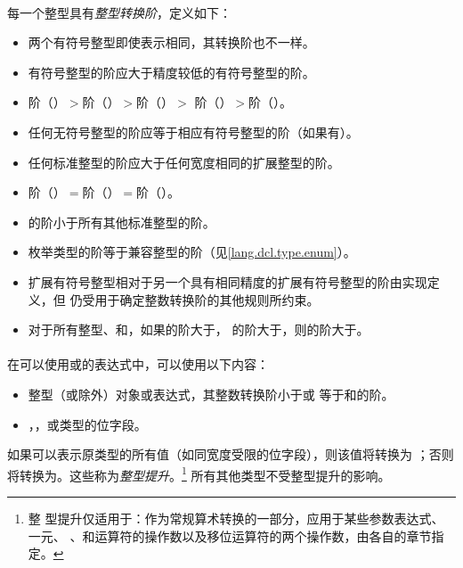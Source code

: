 {\paragraph{}
每一个整型具有\textit{整型转换阶}，定义如下：
\begin{itemize}
  \item{两个有符号整型即使表示相同，其转换阶也不一样。}
  \item{有符号整型的阶应大于精度较低的有符号整型的阶。}
  \item{阶（）$>$阶（）$>$阶（）$>$
    阶（）$>$阶（）。}
  \item{任何无符号整型的阶应等于相应有符号整型的阶（如果有）。}
  \item{任何标准整型的阶应大于任何宽度相同的扩展整型的阶。}
  \item{阶（）$=$阶（）$=$阶（）。}
  \item{的阶小于所有其他标准整型的阶。}
  \item{枚举类型的阶等于兼容整型的阶（见\ref{lang.dcl.type.enum}）。}
  \item{扩展有符号整型相对于另一个具有相同精度的扩展有符号整型的阶由实现定义，但
    仍受用于确定整数转换阶的其他规则所约束。}
  \item{对于所有整型、和，如果的阶大于，
    的阶大于，则的阶大于。}
\end{itemize}

\paragraph{}
在可以使用或的表达式中，可以使用以下内容：
\begin{itemize}
  \item{整型（或除外）对象或表达式，其整数转换阶小于或
    等于和的阶。}
  \item{，，或类型的位字段。}
\end{itemize}
如果可以表示原类型的所有值（如同宽度受限的位字段），则该值将转换为
；否则将转换为。这些称为\textit{整型提升}。\footnote{整
型提升仅适用于：作为常规算术转换的一部分，应用于某些参数表达式、一元\tm{+}、
\tm{-}、和\tm{\~}运算符的操作数以及移位运算符的两个操作数，由各自的章节指定。}
所有其他类型不受整型提升的影响。

}
